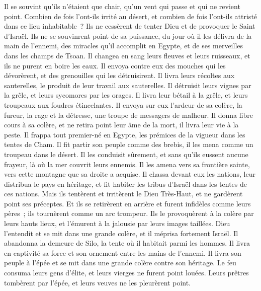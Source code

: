 \begin{multicols}{2}
Il se souvint qu'ils n'étaient que chair, qu'un vent qui passe et qui ne revient point.
Combien de fois l'ont-ils irrité au désert, et combien de fois l'ont-ils attristé dans ce lieu inhabitable~?
Ils ne cessèrent de tenter Dieu et de provoquer le Saint d'Israël.
Ils ne se souvinrent point de sa puissance, du jour où il les délivra de la main de l'ennemi,
des miracles qu'il accomplit en Egypte, et de ses merveilles dans les champs de Tsoan.
Il changea en sang leurs fleuves et leurs ruisseaux, et ils ne purent en boire les eaux.
Il envoya contre eux des mouches qui les dévorèrent, et des grenouilles qui les détruisirent.
Il livra leurs récoltes aux sauterelles, le produit de leur travail aux sauterelles.
Il détruisit leurs vignes par la grêle, et leurs sycomores par les orages.
Il livra leur bétail à la grêle, et leurs troupeaux aux foudres étincelantes.
Il envoya sur eux l'ardeur de sa colère, la fureur, la rage et la détresse, une troupe de messagers de malheur.
Il donna libre cours à sa colère, et ne retira point leur âme de la mort, il livra leur vie à la peste.
Il frappa tout premier-né en Egypte, les prémices de la vigueur dans les tentes de Cham.
Il fit partir son peuple comme des brebis, il les mena comme un troupeau dans le désert.
Il les conduisit sûrement, et sans qu'ils eussent aucune frayeur, là où la mer couvrit leurs ennemis.
Il les amena vers sa frontière sainte, vers cette montagne que sa droite a acquise.
Il chassa devant eux les nations, leur distribua le pays en héritage, et fit habiter les tribus d'Israël dans les tentes de ces nations.
Mais ils tentèrent et irritèrent le Dieu Très-Haut, et ne gardèrent point ses préceptes.
Et ils se retirèrent en arrière et furent infidèles comme leurs pères~; ils tournèrent comme un arc trompeur.
Ils le provoquèrent à la colère par leurs hauts lieux, et l'émurent à la jalousie par leurs images taillées.
Dieu l'entendit et se mit dans une grande colère, et il méprisa fortement Israël.
Il abandonna la demeure de Silo, la tente où il habitait parmi les hommes.
Il livra en captivité sa force et son ornement entre les mains de l'ennemi.
Il livra son peuple à l'épée et se mit dans une grande colère contre son héritage.
Le feu consuma leurs gens d'élite, et leurs vierges ne furent point louées.
Leurs prêtres tombèrent par l'épée, et leurs veuves ne les pleurèrent point.

\end{multicols}
